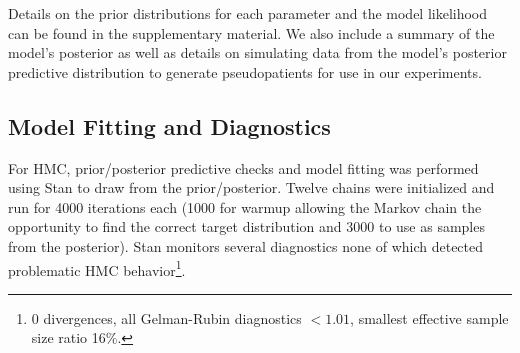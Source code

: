 %
%
%
%

Details on the prior distributions for each parameter and the model likelihood can be found in the supplementary material.  We also include a summary of the model's posterior as well as details on simulating data from the model's posterior predictive distribution to generate pseudopatients for use in our experiments.

\subsection*{Model Fitting and Diagnostics}

For HMC, prior/posterior predictive checks and model fitting was performed using Stan \cite{Carpenter2017-qf} to draw from the prior/posterior.  Twelve chains were initialized and run for 4000 iterations each (1000 for warmup allowing the Markov chain the opportunity to find the correct target distribution and 3000 to use as samples from the posterior). Stan monitors several diagnostics none of which detected problematic HMC behavior\footnote{0 divergences, all Gelman-Rubin diagnostics $<1.01$, smallest effective sample size ratio 16\%.}.

